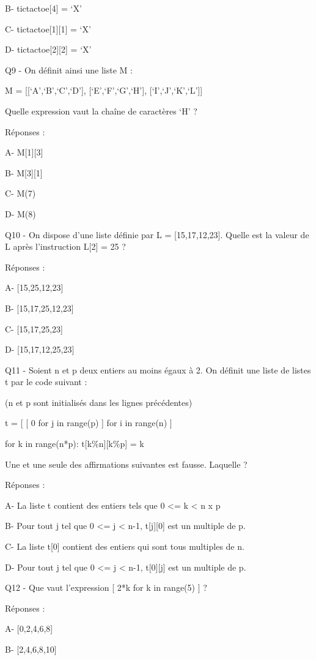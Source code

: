 \documentclass[
]{book}
\begin{document}
B- tictactoe{[}4{]} = `X'

C- tictactoe{[}1{]}{[}1{]} = `X'

D- tictactoe{[}2{]}{[}2{]} = `X'

Q9 - On définit ainsi une liste M :

M = {[}{[}`A',`B',`C',`D'{]}, {[}`E',`F',`G',`H'{]}, {[}`I',`J',`K',`L'{]}{]}

Quelle expression vaut la chaîne de caractères `H' ?

Réponses :

A- M{[}1{]}{[}3{]}

B- M{[}3{]}{[}1{]}

C- M(7)

D- M(8)

Q10 - On dispose d'une liste définie par L = {[}15,17,12,23{]}. Quelle est la valeur de L après l'instruction L{[}2{]} = 25 ?

Réponses :

A- {[}15,25,12,23{]}

B- {[}15,17,25,12,23{]}

C- {[}15,17,25,23{]}

D- {[}15,17,12,25,23{]}

Q11 - Soient n et p deux entiers au moins égaux à 2. On définit une liste de listes t par le code suivant :

(n et p sont initialisés dans les lignes précédentes)

t = {[} {[} 0 for j in range(p) {]} for i in range(n) {]}

for k in range(n*p):
t{[}k\%n{]}{[}k\%p{]} = k

Une et une seule des affirmations suivantes est fausse. Laquelle ?

Réponses :

A- La liste t contient des entiers tels que 0 \textless= k \textless{} n x p

B- Pour tout j tel que 0 \textless= j \textless{} n-1, t{[}j{]}{[}0{]} est un multiple de p.

C- La liste t{[}0{]} contient des entiers qui sont tous multiples de n.

D- Pour tout j tel que 0 \textless= j \textless{} n-1, t{[}0{]}{[}j{]} est un multiple de p.

Q12 - Que vaut l'expression {[} 2*k for k in range(5) {]} ?

Réponses :

A- {[}0,2,4,6,8{]}

B- {[}2,4,6,8,10{]}
\end{document}

